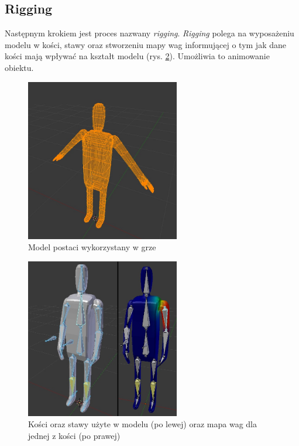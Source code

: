 \documentclass[multip]{SGGW-thesis}
\begin{document}
	\subsection{Rigging}
Następnym krokiem jest proces nazwany {\em rigging}\cite{whats-rigging}. {\em Rigging} polega na wyposażeniu modelu w kości, stawy oraz stworzeniu mapy wag informującej o tym jak dane kości mają wpływać na kształt modelu (rys. \ref{blender-rigging}). Umożliwia to animowanie obiektu.
\clearpage
\begin{figure}
		\centering
			\includegraphics[width=0.6\textwidth]{figures/adimodel.jpg}
		\caption{Model postaci wykorzystany w grze}
		\label{blender-model}
\end{figure}
\begin{figure}
		\centering
			\includegraphics[width=0.6\textwidth]{figures/adirig.jpg}
		\caption{Kości oraz stawy użyte w modelu (po lewej) oraz mapa wag dla jednej z kości (po prawej)}
		\label{blender-rigging}
\end{figure}
\clearpage
\end{document}
